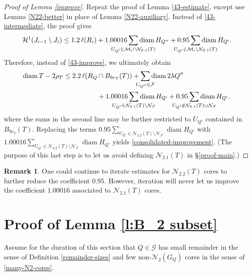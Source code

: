\documentclass[12pt]{amsart}
\numberwithin{equation}{section}
\theoremstyle{plain}
\theoremstyle{definition}
\newtheorem{remark}[theorem]{Remark}
\newcommand{\diam}{\mathop\mathrm{diam}\nolimits}
\newcommand{\Haus}{\mathcal{H}}
\numberwithin{figure}{section}
\begin{document}
\begin{proof}[Proof of Lemma \ref{improve}]
Repeat the proof of Lemma \ref{43-estimate}, except use Lemma \ref{N22-better} in place of Lemma \ref{N22-auxiliary}. Instead of \eqref{43-intermediate}, the proof gives \begin{equation}\label{b43-intermediate} \Haus^1(J_{i-1}\setminus J_{i}) \leq 1.2\,\ell(R_i) + 1.00016\sum_{\mathclap{U_{Q'}\in \mathcal{M}_i\cap\mathcal{N}_{2.1}(T)}}\diam H_{Q''}+0.95\sum_{\mathclap{U_{Q'}\in \mathcal{M}_i\setminus\mathcal{N}_{2.1}(T)}} \diam H_{Q'}.\end{equation} Therefore, instead of \eqref{43-improve}, we ultimately obtain \begin{equation}\begin{split} \label{b43-improvement}
   \diam T-2\rho_T\leq 2.2\,\ell(R_Q&\cap B_{9r_T}(T)) + \sum_{\mathclap{U_{Q''}\in \mathcal{F}}} \diam 2\lambda Q'' \\ &+ 1.00016 \sum_{\mathclap{U_{Q'}\in \mathcal{N}_{2.1}(T)\setminus\mathcal{N}_\mathcal{F}}}\diam H_{Q'} + 0.95 \sum_{\mathclap{U_{Q'}\not\in\mathcal{N}_{2.1}(T)\cup\mathcal{N}_\mathcal{F}}} \diam H_{Q'}.
\end{split}\end{equation} where the sums in the second line may be further restricted to $U_{Q'}$ contained in $B_{9r_T}(T)$. Replacing the terms $0.95\sum_{U_{Q'}\in\mathcal{N}_{2.2}(T)\setminus\mathcal{N}_\mathcal{F}}\diam H_{Q'}$ with $1.00016\sum_{U_{Q'}\in\mathcal{N}_{2.2}(T)\setminus\mathcal{N}_\mathcal{F}}\diam H_{Q'}$ yields \eqref{consolidated-improvement}. (The purpose of this last step is to let us avoid defining $\mathcal{N}_{2.1}(T)$ in \S\ref{proof-main}.)\end{proof}

\begin{remark}One could continue to iterate estimates for $\mathcal{N}_{2.2}(T)$ cores to further reduce the coefficient 0.95. However, iteration will never let us improve the coefficient $1.00016$ associated to $\mathcal{N}_{2.1}(T)$ cores.\end{remark}

\section{Proof of Lemma \ref{l:B_2 subset}}\label{proof-II}

Assume for the duration of this section that $Q\in\mathscr{G}$ has small remainder in the sense of Definition \ref{remainder-sizes} and few non-$\mathcal{N}_2(G_Q)$ cores in the sense of \eqref{many-N2-cores}.
\end{document}
